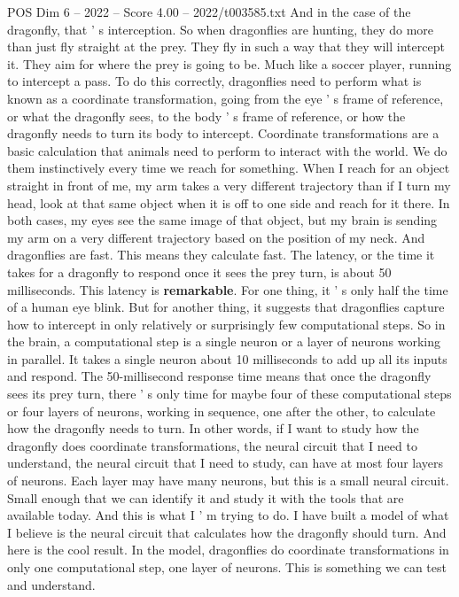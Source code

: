 \begin{textsample}{POS Dim 6 – 2022 – Score 4.00 – 2022/t003585.txt}
And in the case of the dragonfly, that ' s interception.
So when dragonflies are hunting, they do more than just fly straight at the prey.
They fly in such a way that they will intercept it.
They aim for where the prey is going to be.
Much like a soccer player, running to intercept a pass.
To do this correctly, dragonflies need to perform what is known as a coordinate transformation, going from the eye ' s frame of reference, or what the dragonfly sees, to the body ' s frame of reference, or how the dragonfly needs to turn its body to intercept.
Coordinate transformations are a basic calculation that animals need to perform to interact with the world.
We do them instinctively every time we reach for something.
When I reach for an object straight in front of me, my arm takes a very different trajectory than if I turn my head, look at that same object when it is off to one side and reach for it there.
In both cases, my eyes see the same image of that object, but my brain is sending my arm on a very different trajectory based on the position of my neck.
And dragonflies are fast.
This means they calculate fast.
The latency, or the time it takes for a dragonfly to respond once it sees the prey turn, is about 50 milliseconds.
This latency is \textbf{remarkable}.
For one thing, it ' s only half the time of a human eye blink.
But for another thing, it suggests that dragonflies capture how to intercept in only relatively or surprisingly few computational steps.
So in the brain, a computational step is a single neuron or a layer of neurons working in parallel.
It takes a single neuron about 10 milliseconds to add up all its inputs and respond.
The 50-millisecond response time means that once the dragonfly sees its prey turn, there ' s only time for maybe four of these computational steps or four layers of neurons, working in sequence, one after the other, to calculate how the dragonfly needs to turn.
In other words, if I want to study how the dragonfly does coordinate transformations, the neural circuit that I need to understand, the neural circuit that I need to study, can have at most four layers of neurons.
Each layer may have many neurons, but this is a small neural circuit.
Small enough that we can identify it and study it with the tools that are available today.
And this is what I ' m trying to do.
I have built a model of what I believe is the neural circuit that calculates how the dragonfly should turn.
And here is the cool result.
In the model, dragonflies do coordinate transformations in only one computational step, one layer of neurons.
This is something we can test and understand.

\end{textsample}
